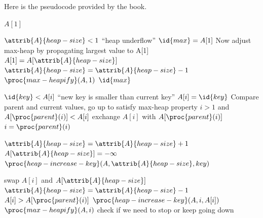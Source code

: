 \documentclass{article}
\begin{document}
\newpage

Here is the pseudocode provided by the book.
\begin{codebox}
\li \Return $A[1]$
\end{codebox}

\begin{codebox}
\li \If $\attrib{A}{heap-size} < 1$
\li \Then
        \Error ``heap underflow''
    \End
\li $\id{max} = A[1]$
\li \Comment Now adjust max-heap by propagating largest value to A[1]
\li $A[1] = A[\attrib{A}{heap-size}]$
\li $\attrib{A}{heap-size} = \attrib{A}{heap-size} - 1$
\li $\proc{max-heapify}(A, 1)$
\li \Return $\id{max}$
\end{codebox}

\begin{codebox}
\li \If $\id{key} < A[i]$
\li \Then
        \Error ``new key is smaller than current key''
    \End
\li $A[i] = \id{key}$
\li \Comment Compare parent and current values, go up to satisfy max-heap property
\li \While $i >  1$ and $A[\proc{parent}(i)] < A[i]$
\li \Do
        exchange $A[i]$ with $A[\proc{parent}(i)]$
\li     $i = \proc{parent}(i)$
    \End
\end{codebox}

\begin{codebox}
\li $\attrib{A}{heap-size} = \attrib{A}{heap-size} + 1$
\li $A[\attrib{A}{heap-size}] = -\infty$
\li $\proc{heap-increase-key}(A, \attrib{A}{heap-size}, key)$
\end{codebox}

\begin{codebox}
\li swap $A[i]$ and $A[\attrib{A}{heap-size}]$
\li $\attrib{A}{heap-size} = \attrib{A}{heap-size} - 1$
\li \If $A[i] > A[\proc{parent}(i)]$
\li \Then
        $\proc{heap-increase-key}(A, i, A[i])$
    \End
\li \Else
\li \Then
        $\proc{max-heapify}(A, i)$ \Comment check if we need to stop or keep going down
    \End
\end{codebox}
\end{document}
